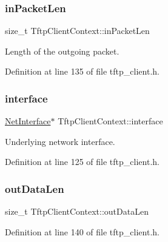 \subsubsection{\texorpdfstring{in\+Packet\+Len}{inPacketLen}}
{\footnotesize\ttfamily size\+\_\+t Tftp\+Client\+Context\+::in\+Packet\+Len}



Length of the outgoing packet. 



Definition at line 135 of file tftp\+\_\+client.\+h.

\mbox{\label{structTftpClientContext_ad17a07e8c1bfd4a9abaf2dbc46c3049a}} 
\subsubsection{\texorpdfstring{interface}{interface}}
{\footnotesize\ttfamily \hyperlink{net_8h_a2234db8911a1148c9159979d8f5e0d6b}{Net\+Interface}$\ast$ Tftp\+Client\+Context\+::interface}



Underlying network interface. 



Definition at line 125 of file tftp\+\_\+client.\+h.

\mbox{\label{structTftpClientContext_a60ec196ee362181351a438d39116b572}} 
\subsubsection{\texorpdfstring{out\+Data\+Len}{outDataLen}}
{\footnotesize\ttfamily size\+\_\+t Tftp\+Client\+Context\+::out\+Data\+Len}



Definition at line 140 of file tftp\+\_\+client.\+h.

\mbox{\label{structTftpClientContext_ad79208d8abaf2c5e951c01f072b5c6e6}} 
